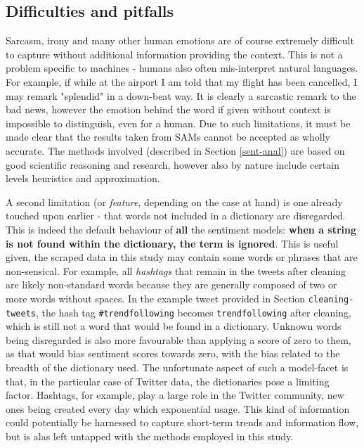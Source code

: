 \documentclass{article}
\begin{document}
\subsection{Difficulties and pitfalls \label{SA-limits}}
\label{sec-1-3}

Sarcasm, irony and many other human emotions are of course extremely difficult to capture without additional information providing the context. This is not a problem specific to machines - humans also often mis-interpret natural languages. For example, if while at the airport I am told that my flight has been cancelled, I may remark "splendid" in a down-beat way. It is clearly a sarcastic remark to the bad news, however the emotion behind the word if given without context is impossible to distinguish, even for a human. Due to such limitations, it must be made clear that the results taken from SAMs cannot be accepted as wholly accurate. The methods involved (described in Section \ref{sent-anal}) are based on good scientific reasoning and research, however also by nature include certain levels heuristics and approximation.

A second limitation (or \emph{feature}, depending on the case at hand) is one already touched upon earlier - that words not included in a dictionary are disregarded. This is indeed the default behaviour of \textbf{all} the sentiment models: \textbf{when a string is not found within the dictionary, the term is ignored}. This is useful given, the scraped data in this study may contain some words or phrases that are non-sensical. For example, all \emph{hashtags} that remain in the tweets after cleaning are likely non-standard words because they are generally composed of two or more words without spaces. In the example tweet provided in Section \texttt{cleaning-tweets}, the hash tag \texttt{\#trendfollowing} becomes \texttt{trendfollowing} after cleaning, which is still not a word that would be found in a dictionary. Unknown words being disregarded is also more favourable than applying a score of zero to them, as that would bias sentiment scores towards zero, with the bias related to the breadth of the dictionary used.
The unfortunate aspect of such a model-facet is that, in the particular case of Twitter data, the dictionaries pose a limiting factor. Hashtags, for example, play a large role in the Twitter community, new ones being created every day which exponential usage. This kind of information could potentially be harnessed to capture short-term trends and information flow, but is alas left untapped with the methods employed in this study.
\end{document}
